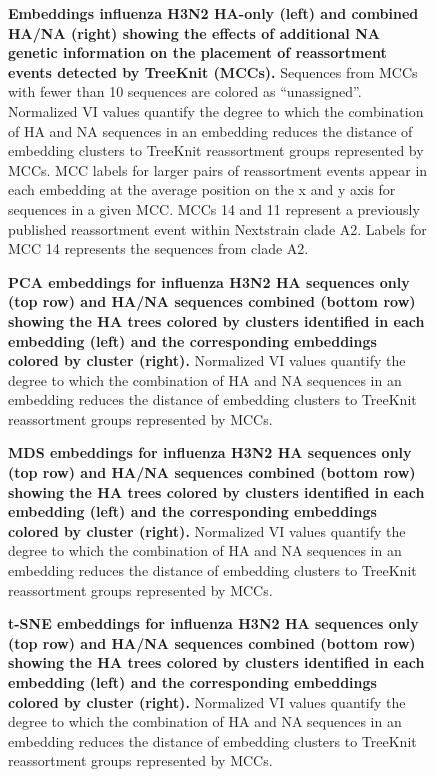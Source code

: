 \documentclass[webpdf,contemporary,large,single]{oup-authoring-template}%
\theoremstyle{thmstyleone}%
\theoremstyle{thmstyletwo}%
\theoremstyle{thmstylethree}%
\begin{document}
\begin{figure}[H]
\caption{{\bf Embeddings influenza H3N2 HA-only (left) and combined HA/NA (right) showing the effects of additional NA genetic information on the placement of reassortment events detected by TreeKnit (MCCs).}
  Sequences from MCCs with fewer than 10 sequences are colored as ``unassigned''.
  Normalized VI values quantify the degree to which the combination of HA and NA sequences in an embedding reduces the distance of embedding clusters to TreeKnit reassortment groups represented by MCCs.
  MCC labels for larger pairs of reassortment events appear in each embedding at the average position on the x and y axis for sequences in a given MCC.
  MCCs 14 and 11 represent a previously published reassortment event within Nextstrain clade A2.
  Labels for MCC 14 represents the sequences from clade A2.}\label{S_Fig_full_ha_na_embeddings}
\end{figure}

\begin{figure}[H]
\caption{{\bf PCA embeddings for influenza H3N2 HA sequences only (top row) and HA/NA sequences combined (bottom row) showing the HA trees colored by clusters identified in each embedding (left) and the corresponding embeddings colored by cluster (right).}
  Normalized VI values quantify the degree to which the combination of HA and NA sequences in an embedding reduces the distance of embedding clusters to TreeKnit reassortment groups represented by MCCs.}\label{S_Fig_flu_ha_na_pca_embeddings}
\end{figure}

\begin{figure}[H]
\caption{{\bf MDS embeddings for influenza H3N2 HA sequences only (top row) and HA/NA sequences combined (bottom row) showing the HA trees colored by clusters identified in each embedding (left) and the corresponding embeddings colored by cluster (right).}
  Normalized VI values quantify the degree to which the combination of HA and NA sequences in an embedding reduces the distance of embedding clusters to TreeKnit reassortment groups represented by MCCs.}\label{S_Fig_flu_ha_na_mds_embeddings}
\end{figure}

\begin{figure}[H]
\caption{{\bf t-SNE embeddings for influenza H3N2 HA sequences only (top row) and HA/NA sequences combined (bottom row) showing the HA trees colored by clusters identified in each embedding (left) and the corresponding embeddings colored by cluster (right).}
  Normalized VI values quantify the degree to which the combination of HA and NA sequences in an embedding reduces the distance of embedding clusters to TreeKnit reassortment groups represented by MCCs.}\label{S_Fig_flu_ha_na_tsne_embeddings}
\end{figure}
\end{document}
